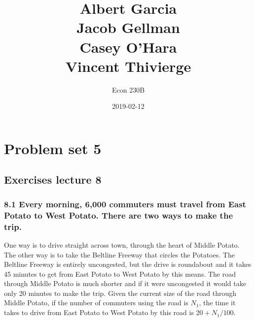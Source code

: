 \documentclass[]{article}
\title{\hfill \large{Albert Garcia}\\
\hfill \large{Jacob Gellman}\\
\hfill \large{Casey O'Hara}\\
\hfill \large{Vincent Thivierge}}
\author{\hfill Econ 230B}
\date{\hfill 2019-02-12}
\begin{document}
\maketitle

\newcommand{\EE}{\mathbb{E}}
\newcommand{\eps}{\varepsilon}
\newcommand{\LL}{\mathscr{L}}
\newcommand{\dd}{\partial}

\section{Problem set 5}\label{problem-set-5}

\subsection{Exercises lecture 8}\label{exercises-lecture-8}

\subsubsection{8.1 Every morning, 6,000 commuters must travel from East
Potato to West Potato. There are two ways to make the
trip.}\label{every-morning-6000-commuters-must-travel-from-east-potato-to-west-potato.-there-are-two-ways-to-make-the-trip.}

One way is to drive straight across town, through the heart of Middle
Potato. The other way is to take the Beltline Freeway that circles the
Potatoes. The Beltline Freeway is entirely uncongested, but the drive is
roundabout and it takes 45 minutes to get from East Potato to West
Potato by this means. The road through Middle Potato is much shorter and
if it were uncongested it would take only 20 minutes to make the trip.
Given the current size of the road through Middle Potato, if the number
of commuters using the road is \(N_1\), the time it takes to drive from
East Potato to West Potato by this road is \(20 + N_1/100\).
\end{document}
